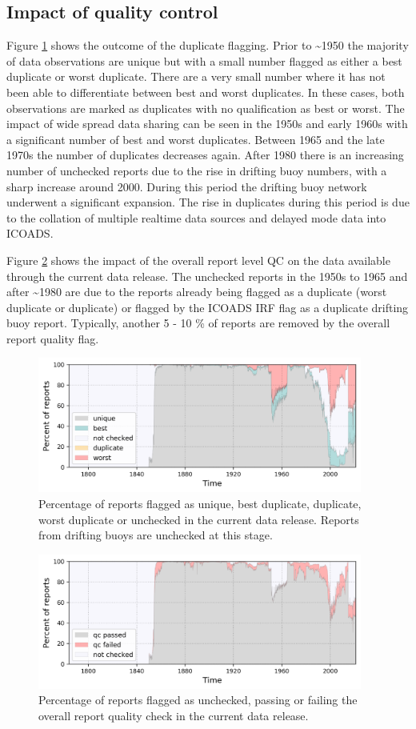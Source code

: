 \subsection{Impact of quality control}
Figure \ref{fig:dup_status} shows the outcome of the duplicate flagging. 
Prior to \sim 1950 the majority of data observations are unique but with a small number flagged as either a best duplicate or worst duplicate.
There are a very small number where it has not been able to differentiate between best and worst duplicates. 
In these cases, both observations are marked as duplicates with no qualification as best or worst.
The impact of wide spread data sharing can be seen in the 1950s and early 1960s with a significant number of best and worst duplicates. 
Between 1965 and the late 1970s the number of duplicates decreases again.
After 1980 there is an increasing number of unchecked reports due to the rise in drifting buoy numbers, with a sharp increase around 2000.
During this period the drifting buoy network underwent a significant expansion.
The rise in duplicates during this period is due to the collation of multiple realtime data sources and delayed mode data into ICOADS.

Figure \ref{fig:report_qc} shows the impact of the overall report level QC on the data available through the current data release. 
The unchecked reports in the 1950s to 1965 and after \sim 1980 are due to the reports already being flagged as a duplicate (worst duplicate or duplicate) or flagged by the ICOADS IRF flag as a duplicate drifting buoy report.
Typically, another 5 - 10 \% of reports are removed by the overall report quality flag.

\FloatBarrier

\begin{figure}[htp]
    \includegraphics[width=0.95\textwidth]{resources/duplicate_status-ts.png}
    \caption{Percentage of reports flagged as unique, best duplicate, duplicate, worst duplicate or unchecked in the current data release. Reports from drifting buoys are unchecked at this stage.}
    \label{fig:dup_status}
\end{figure}

\begin{figure}[htp]
    \includegraphics[width=0.95\textwidth]{resources/report_quality-ts.png}
    \caption{Percentage of reports flagged as unchecked, passing or failing the overall report quality check in the current data release.}
    \label{fig:report_qc}
\end{figure}
